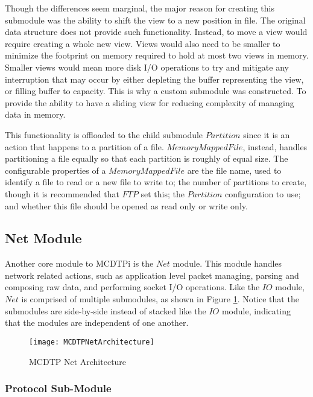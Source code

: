Though the differences seem marginal, the major reason for creating this submodule was the ability to shift the view to a new position in file. The original data structure does not provide such functionality. Instead, to move a view would require creating a whole new view. Views would also need to be smaller to minimize the footprint on memory required to hold at most two views in memory. Smaller views would mean more disk I/O operations to try and mitigate any interruption that may occur by either depleting the buffer representing the view, or filling buffer to capacity. This is why a custom submodule was constructed. To provide the ability to have a sliding view for reducing complexity of managing data in memory.

This functionality is offloaded to the child submodule $Partition$ since it is an action that happens to a partition of a file. $MemoryMappedFile$, instead, handles partitioning a file equally so that each partition is roughly of equal size. The configurable properties of a $MemoryMappedFile$ are the file name, used to identify a file to read or a new file to write to; the number of partitions to create, though it is recommended that $FTP$ set this; the $Partition$ configuration to use; and whether this file should be opened as read only or write only.

\subsection{Net Module}\label{sec:net}

Another core module to MCDTPi is the $Net$ module. This module handles network related actions, such as application level packet managing, parsing and composing raw data, and performing socket I/O operations. Like the $IO$ module, $Net$ is comprised of multiple submodules, as shown in Figure \ref{fig:mcdtp-net-arch}. Notice that the submodules are side-by-side instead of stacked like the $IO$ module, indicating that the modules are independent of one another.

\begin{figure}[ht]
\centering
\texttt{[image: MCDTPNetArchitecture]}
\caption{MCDTP Net Architecture}
\label{fig:mcdtp-net-arch}
\end{figure}

\subsubsection{Protocol Sub-Module}

